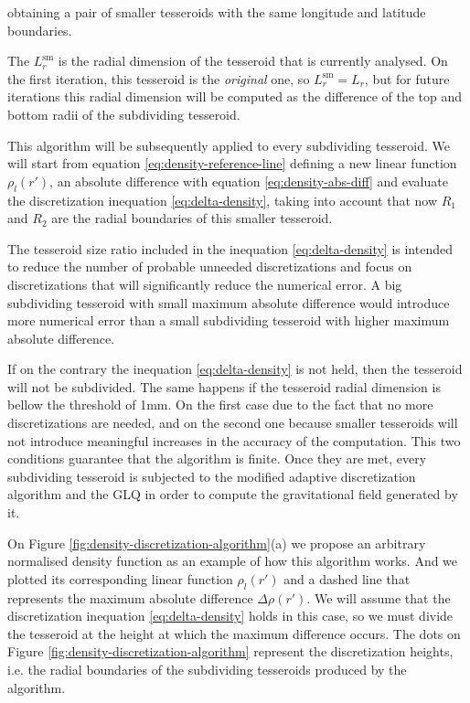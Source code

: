 \documentclass[extra]{gji}
\begin{document}
\noindent obtaining a pair of smaller tesseroids with the same 
longitude and latitude boundaries.

The $L_r^\text{sm}$ is the radial dimension of the tesseroid that is 
currently analysed. On the first iteration, this tesseroid is the 
\emph{original} one, so $L_r^\text{sm} = L_r$, but for future 
iterations this radial dimension will be computed as the difference of 
the top and bottom radii of the subdividing tesseroid.

This algorithm will be subsequently applied to every subdividing 
tesseroid.
We will start from equation \ref{eq:density-reference-line} defining a 
new linear function $\rho_l(r')$, an absolute difference with equation 
\ref{eq:density-abs-diff} and evaluate the discretization inequation 
\ref{eq:delta-density}, taking into account that now $R_1$ and $R_2$ 
are the radial boundaries of this smaller tesseroid.

The tesseroid size ratio included in the inequation 
\ref{eq:delta-density} is intended to reduce the number of probable 
unneeded discretizations and focus on discretizations that will 
significantly reduce the numerical error.
A big subdividing tesseroid with small maximum absolute difference would 
introduce more numerical error than a small subdividing tesseroid with 
higher maximum absolute difference.

If on the contrary the inequation \ref{eq:delta-density} is not held, 
then the tesseroid will not be subdivided.
The same happens if the tesseroid radial dimension is bellow the 
threshold of 1mm. On the first case due to the fact that no more 
discretizations are needed, and on the second one because smaller 
tesseroids will not introduce meaningful increases in the accuracy of 
the computation.
This two conditions guarantee that the algorithm is finite.
Once they are met, every subdividing tesseroid is subjected to the 
modified adaptive discretization algorithm and the GLQ in order to 
compute the gravitational field generated by it.

On Figure \ref{fig:density-discretization-algorithm}(a) we propose an 
arbitrary normalised density function as an example of how this 
algorithm works.
And we plotted its corresponding linear function $\rho_l(r')$ and a 
dashed line that represents the maximum absolute difference $\Delta 
\rho (r')$.
We will assume that the discretization inequation 
\ref{eq:delta-density} holds in this case, so we must divide the 
tesseroid at the height at which the maximum difference occurs.
The dots on Figure \ref{fig:density-discretization-algorithm} 
represent the discretization heights, i.e. the radial boundaries of the 
subdividing tesseroids produced by the algorithm.
\end{document}
